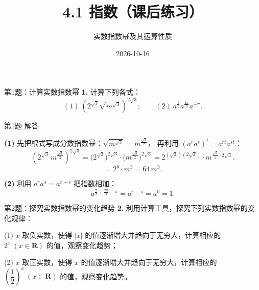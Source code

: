 \documentclass[10pt,aspectratio=169,serif]{beamer}
\title[4.1 指数 练习]{4.1 指数（课后练习）}
\subtitle{实数指数幂及其运算性质}
\author{}
\institute{}
\date{2026-10-16}
\begin{document}
\begin{frame}
  \titlepage
\end{frame}

\begin{frame}[t]{第1题：计算实数指数幂}
\textbf{1.} 计算下列各式：
\[
(1)\ \left(2^{\sqrt{3}}\sqrt{m^{\sqrt{3}}}\right)^{2\sqrt{3}};\qquad
(2)\ a^{\frac{\pi}{3}}a^{\frac{2\pi}{3}}a^{-\pi}.
\]
\end{frame}

\begin{frame}[t]{第1题 解答}
\begin{tcolorbox}[colback=orange!10,colframe=orange,title=\textbf{解}]
\textbf{(1)} 先把根式写成分数指数幂：$\sqrt{m^{\sqrt{3}}}=m^{\frac{\sqrt{3}}{2}}$，
再利用 $(a^{r}a^{s})^{t}=a^{rt}a^{st}$：
\[
\left(2^{\sqrt{3}}\,m^{\frac{\sqrt{3}}{2}}\right)^{2\sqrt{3}}
= \bigl(2^{\sqrt{3}}\bigr)^{2\sqrt{3}}\cdot\bigl(m^{\frac{\sqrt{3}}{2}}\bigr)^{2\sqrt{3}}
= 2^{(\sqrt{3})(2\sqrt{3})}\cdot m^{\frac{\sqrt{3}}{2}\cdot 2\sqrt{3}}.
\]
\[
= 2^{6}\cdot m^{3} = 64\,m^{3}.
\]

\vspace{0.6em}
\textbf{(2)} 利用 $a^{r}a^{s}=a^{r+s}$ 把指数相加：
\[
a^{\frac{\pi}{3}+\frac{2\pi}{3}-\pi} = a^{\pi-\pi} = a^{0} = 1.
\]
\end{tcolorbox}
\end{frame}

\begin{frame}[t]{第2题：探究实数指数幂的变化趋势}
\textbf{2.} 利用计算工具，探究下列实数指数幂的变化规律：

(1) $x$ 取负实数，使得 $|x|$ 的值逐渐增大并趋向于无穷大，计算相应的 $2^{x}\ (x\in\mathbf{R})$ 的值，观察变化趋势；

(2) $x$ 取正实数，使得 $x$ 的值逐渐增大并趋向于无穷大，计算相应的 $\left(\dfrac{1}{2}\right)^{x}\ (x\in\mathbf{R})$ 的值，观察变化趋势。
\end{frame}
\end{document}

